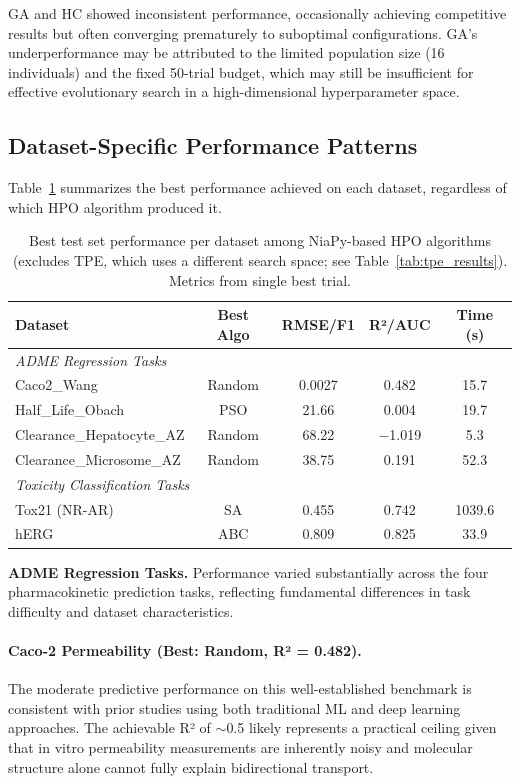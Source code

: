 \documentclass[12pt]{article}
\begin{document}
GA and HC showed inconsistent performance, occasionally achieving competitive results but often converging prematurely to suboptimal configurations. GA's underperformance may be attributed to the limited population size (16 individuals) and the fixed 50-trial budget, which may still be insufficient for effective evolutionary search in a high-dimensional hyperparameter space.


\subsection{Dataset-Specific Performance Patterns}
\label{sec:dataset_patterns}

Table~\ref{tab:best_results} summarizes the best performance achieved on each dataset, regardless of which HPO algorithm produced it.

\begin{table}[htbp]
\centering
\caption{Best test set performance per dataset among NiaPy-based HPO algorithms (excludes TPE, which uses a different search space; see Table~\ref{tab:tpe_results}). Metrics from single best trial.}
\label{tab:best_results}
\small
\begin{tabular}{lcccc}
\toprule
\textbf{Dataset} & \textbf{Best Algo} & \textbf{RMSE/F1} & \textbf{R²/AUC} & \textbf{Time (s)} \\
\midrule
\multicolumn{5}{l}{\emph{ADME Regression Tasks}} \\
\midrule
Caco2\_Wang & Random & 0.0027 & 0.482 & 15.7 \\
Half\_Life\_Obach & PSO & 21.66 & 0.004 & 19.7 \\
Clearance\_Hepatocyte\_AZ & Random & 68.22 & $-$1.019 & 5.3 \\
Clearance\_Microsome\_AZ & Random & 38.75 & 0.191 & 52.3 \\
\midrule
\multicolumn{5}{l}{\emph{Toxicity Classification Tasks}} \\
\midrule
Tox21 (NR-AR) & SA & 0.455 & 0.742 & 1039.6 \\
hERG & ABC & 0.809 & 0.825 & 33.9 \\
\bottomrule
\end{tabular}
\end{table}

\textbf{ADME Regression Tasks.} Performance varied substantially across the four pharmacokinetic prediction tasks, reflecting fundamental differences in task difficulty and dataset characteristics.

\paragraph{Caco-2 Permeability (Best: Random, R² = 0.482).} The moderate predictive performance on this well-established benchmark is consistent with prior studies using both traditional ML and deep learning approaches. The achievable R² of $\sim$0.5 likely represents a practical ceiling given that in vitro permeability measurements are inherently noisy and molecular structure alone cannot fully explain bidirectional transport.
\end{document}
